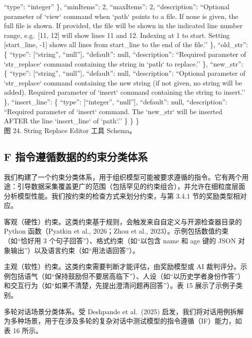 ``type'': ``integer'' \}, ``minItems'': 2, ``maxItems'': 2,
``description'': ``Optional parameter of `view` command when `path`
points to a file. If none is given, the full file is shown. If provided,
the file will be shown in the indicated line number range, e.g.~{[}11,
12{]} will show lines 11 and 12. Indexing at 1 to start. Setting
{[}start\_line, -1{]} shows all lines from start\_line to the end of the
file.'' \}, ``old\_str'': \{ ``type'': {[}``string'', ``null''{]},
``default'': null, ``description'': ``Required parameter of
`str\_replace` command containing the string in `path` to replace.'' \},
``new\_str'': \{ ``type'': {[}``string'', ``null''{]}, ``default'':
null, ``description'': ``Optional parameter of `str\_replace` command
containing the new string (if not given, no string will be added).
Required parameter of `insert` command containing the string to
insert.'' \}, ``insert\_line'': \{ ``type'': {[}``integer'',
``null''{]}, ``default'': null, ``description'': ``Required parameter of
`insert` command. The `new\_str` will be inserted AFTER the line
`insert\_line` of `path`.'' \} \} \}\\
图 24. String Replace Editor 工具 Schema。



\subsection{F 指令遵循数据的约束分类体系}\label{f-constraint-taxonomy-for-instruction-following-data}

我们构建了一个约束分类体系，用于组织模型可能被要求遵循的指令。它有两个用途：引导数据采集覆盖更广的范围（包括罕见的约束组合），并允许在细粒度层面分析模型性能。我们按约束的检查方式来划分约束，与第 3.4.1 节的奖励类型相对应。

客观（硬性）约束。这类约束基于规则，会触发来自自定义与开源检查器目录的 Python 函数（Pyatkin et al., 2026；Zhou et al., 2023）。示例包括数值约束（如``恰好用 3 个句子回答''）、格式约束（如``以包含 name 和 age 键的 JSON 对象输出''）以及语言约束（如``用法语回答''）。

主观（软性）约束。这类约束需要判断才能评估，由奖励模型或 AI 裁判评分。示例包括语气（如``保持鼓励但不要居高临下''）、人设（如``以历史学者身份作答''）和交互行为（如``如果不清楚，先提出澄清问题再回答''）。表 15 展示了示例子类别。

多轮对话场景分类体系。受 Deshpande et al.~(2025) 启发，我们将对话用例拆解为多种场景，用于在涉及多轮的复杂对话中测试模型的指令遵循（IF）能力，如表 16 所示。
